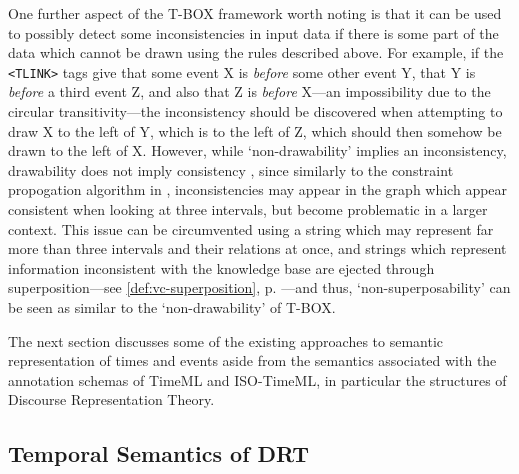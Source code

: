 \documentclass[a4paper,12pt,leqno,twoside]{article}
\newcommand{\nb}[1]{{\color{red}[NB\footnote{{\color{red}#1}}]}}
\begin{document}
One further aspect of the T-BOX framework worth noting is that it can be used to possibly detect some inconsistencies in input data if there is some part of the data which cannot be drawn using the rules described above. For example, if the \verb|<TLINK>| tags give that some event X is \textit{before} some other event Y, that Y is \textit{before} a third event Z, and also that Z is \textit{before} X---an impossibility due to the circular transitivity---the inconsistency should be discovered when attempting to draw X to the left of Y, which is to the left of Z, which should then somehow be drawn to the left of X. However, while `non-drawability' implies an inconsistency, drawability does not imply consistency \citep[p. 12]{verhagen2005TBOX}, since similarly to the constraint propogation algorithm in \citet{allen1983maintaining}, inconsistencies may appear in the graph which appear consistent when looking at three intervals, but become problematic in a larger context. This issue can be circumvented using a string which may represent far more than three intervals and their relations at once, and strings which represent information inconsistent with the knowledge base are ejected through superposition---see \cref{def:vc-superposition}, p. \pageref{def:vc-superposition}---and thus, `non-superposability' can be seen as similar to the `non-drawability' of T-BOX.

The next section discusses some of the existing approaches to semantic representation of times and events aside from the semantics associated with the annotation schemas of TimeML and ISO-TimeML, in particular the structures of Discourse Representation Theory.

\subsection{Temporal Semantics of DRT}\label{sub:semantics}
\end{document}
